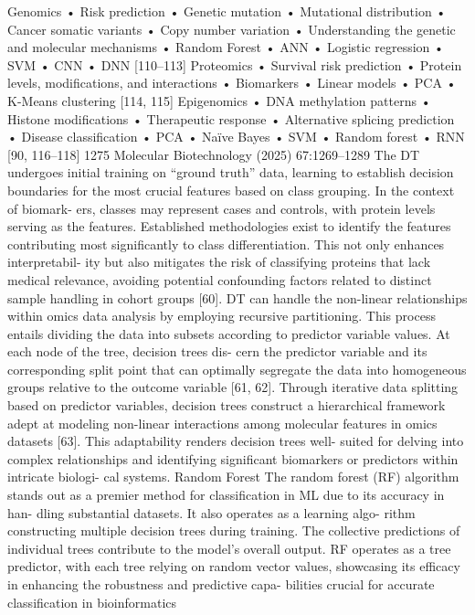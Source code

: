 Genomics
• Risk prediction
• Genetic mutation
• Mutational distribution
• Cancer somatic variants
• Copy number variation
• Understanding the genetic and molecular mechanisms
• Random Forest
• ANN
• Logistic regression
• SVM
• CNN
• DNN
[110–113]
Proteomics
• Survival risk prediction
• Protein levels, modifications, and interactions
• Biomarkers
• Linear models
• PCA
• K-Means clustering
[114, 115]
Epigenomics
• DNA methylation patterns
• Histone modifications
• Therapeutic response
• Alternative splicing prediction
• Disease classification
• PCA
• Naïve Bayes
• SVM
• Random forest
• RNN
[90, 116–118]
1275
Molecular Biotechnology (2025) 67:1269–1289
The DT undergoes initial training on “ground truth” data,
learning to establish decision boundaries for the most crucial
features based on class grouping. In the context of biomark-
ers, classes may represent cases and controls, with protein
levels serving as the features. Established methodologies
exist to identify the features contributing most significantly
to class differentiation. This not only enhances interpretabil-
ity but also mitigates the risk of classifying proteins that lack
medical relevance, avoiding potential confounding factors
related to distinct sample handling in cohort groups [60]. DT
can handle the non-linear relationships within omics data
analysis by employing recursive partitioning. This process
entails dividing the data into subsets according to predictor
variable values. At each node of the tree, decision trees dis-
cern the predictor variable and its corresponding split point
that can optimally segregate the data into homogeneous
groups relative to the outcome variable [61, 62]. Through
iterative data splitting based on predictor variables, decision
trees construct a hierarchical framework adept at modeling
non-linear interactions among molecular features in omics
datasets [63]. This adaptability renders decision trees well-
suited for delving into complex relationships and identifying
significant biomarkers or predictors within intricate biologi-
cal systems.
Random Forest
The random forest (RF) algorithm stands out as a premier
method for classification in ML due to its accuracy in han-
dling substantial datasets. It also operates as a learning algo-
rithm constructing multiple decision trees during training.
The collective predictions of individual trees contribute to
the model’s overall output. RF operates as a tree predictor,
with each tree relying on random vector values, showcasing
its efficacy in enhancing the robustness and predictive capa-
bilities crucial for accurate classification in bioinformatics
